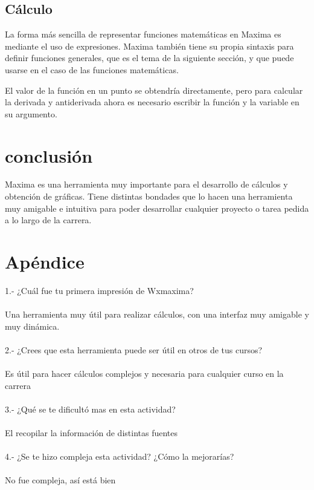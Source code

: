 \documentclass{article}
\begin{document}
\subsection{Cálculo}

La forma más sencilla de representar funciones matemáticas en Maxima es mediante el uso de expresiones. Maxima también tiene su propia sintaxis para definir funciones generales, que es el tema de la siguiente sección, y que puede usarse en el caso de las funciones matemáticas.

El valor de la función en un punto se obtendría directamente, pero para calcular la derivada y antiderivada ahora es necesario escribir la función y la variable en su argumento.

\section{conclusión}

Maxima es una herramienta muy importante para el desarrollo de cálculos y obtención de gráficas. Tiene distintas bondades que lo hacen una herramienta muy amigable e intuitiva para poder desarrollar cualquier proyecto o tarea pedida a lo largo de la carrera.


\section{Apéndice}

1.- ¿Cuál fue tu primera impresión de Wxmaxima?
\\
\\
Una herramienta muy útil para realizar cálculos, con una interfaz muy amigable y muy dinámica.
\\
\\
2.- ¿Crees que esta herramienta puede ser útil en otros de tus cursos?
\\
\\
Es útil para hacer cálculos complejos y necesaria para cualquier curso en la carrera
\\
\\
3.- ¿Qué se te dificultó mas en esta actividad?
\\
\\
El recopilar la información de distintas fuentes
\\
\\
4.- ¿Se te hizo compleja esta actividad? ¿Cómo la mejorarías? 
\\
\\
No fue compleja, así está bien
\end{document}
